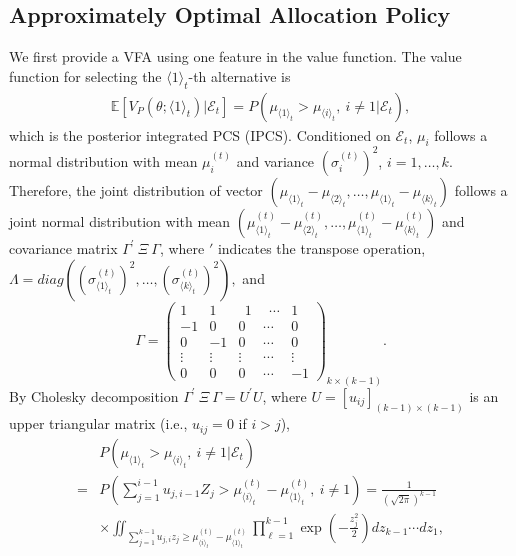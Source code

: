 \documentclass[journal]{IEEEtran}
\begin{document}
  \subsection{Approximately Optimal Allocation Policy}
   We first provide a VFA using one feature in the value function.
The  value function  for selecting the $\langle 1 \rangle_t$-th alternative is 
 \begin{align}\label{vf}
 \mathbb{E}[V_P(\theta;\langle 1 \rangle_t)| \mathcal{E}_t]=P\left( \mu_{\langle 1 \rangle_t}>\mu_{\langle i \rangle_t},~i\neq 1|\mathcal{E}_t\right),
 \end{align}
 which is the posterior integrated PCS (IPCS). 
 Conditioned on $\mathcal{E}_t$, $\mu_i$ follows a normal distribution with mean $\mu_i^{(t)}$ and variance $(\sigma_i^{(t)})^2$, $i=1,\ldots,k$. Therefore, the joint distribution of vector $(\mu_{\langle 1 \rangle_t}-\mu_{\langle 2\rangle_t},\ldots,\mu_{\langle 1 \rangle_t}-\mu_{\langle k\rangle_t})$ follows a joint normal distribution with mean $(\mu_{\langle 1 \rangle_t}^{(t)}-\mu_{\langle 2\rangle_t}^{(t)},\ldots,\mu_{\langle 1 \rangle_t}^{(t)}-\mu_{\langle k\rangle_t}^{(t)})$ and covariance matrix $\Gamma^{'}~\Xi ~\Gamma$, where $'$ indicates the transpose operation, 
 $ \Lambda=diag( (\sigma_{\langle 1 \rangle_t}^{(t)})^2,\ldots,(\sigma_{\langle k\rangle_t}^{(t)})^2),
 $
and 
$$
\Gamma = \left( \begin{array}{rrrrr}
1 & 1 & ~~1 & ~~\cdots & 1 \\
-1 & 0 & 0 & \cdots & 0 \\
0 & -1 & 0 & \cdots & 0 \\
\vdots & \vdots & \vdots & \cdots & \vdots \\
0 & 0 & 0 & \cdots & -1
\end{array} \right)_{k \times (k-1)} .
$$
By Cholesky decomposition $\Gamma^{'}~\Xi ~\Gamma=U^{'} U$, where $U=[u_{ij}]_{(k-1)\times (k-1)}$ is an upper triangular matrix
(i.e., $u_{ij}=0$ if $i>j$),
\begin{align*}
& P(\mu_{\langle 1 \rangle_t}>\mu_{\langle i \rangle_t},~i\neq 1|\mathcal{E}_t) \\=&P\left(\sum_{j=1}^{i-1} u_{j,i-1} Z_{j} > \mu_{\langle i \rangle_t}^{(t)} - \mu_{\langle 1 \rangle_t}^{(t)}, ~i\neq 1\right)=\frac{1}{(\sqrt{2\pi})^{k-1}}  \\
 &\times\iint_{\sum_{j=1}^{k-1} u_{j,i} z_{j} \geq \mu_{\langle i \rangle_t}^{(t)}- \mu_{\langle 1 \rangle_t}^{(t)}}\prod_{\ell=1}^{k-1}\exp\left(-\frac{z_{j}^2}{2}\right)d z_{k-1} \cdots dz_1,
\end{align*}
\end{document}

